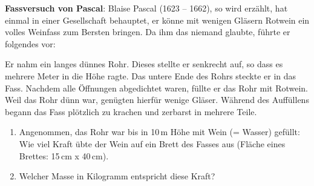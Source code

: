 \documentclass[11pt]{article}
\begin{document}
\begin{minipage}{0.7\textwidth}
    \textbf{Fassversuch von Pascal}: Blaise Pascal (1623 – 1662), so wird erzählt, hat einmal in einer Gesellschaft behauptet, er könne mit wenigen Gläsern Rotwein ein volles Weinfass zum Bersten bringen. Da ihm das niemand glaubte, führte er folgendes vor:

    Er nahm ein langes dünnes Rohr. Dieses stellte er senkrecht auf, so dass es mehrere Meter in die Höhe ragte. Das untere Ende des Rohrs steckte er in das Fass. Nachdem alle Öffnungen abgedichtet waren, füllte er das Rohr mit Rotwein. Weil das Rohr dünn war, genügten hierfür wenige Gläser. Während des Auffüllens begann das Fass plötzlich zu krachen und zerbarst in mehrere Teile.

    \begin{enumerate}
        \item Angenommen, das Rohr war bis in 10\,m Höhe mit Wein (= Wasser) gefüllt: Wie viel Kraft übte der Wein auf ein Brett des Fasses aus (Fläche eines Brettes: 15\,cm x 40\,cm). \vspace{3cm}
        
        \item Welcher Masse in Kilogramm entspricht diese Kraft?
    \end{enumerate}

\end{minipage}
\end{document}
